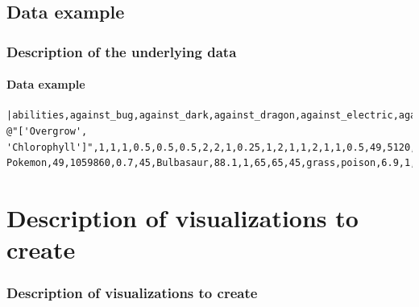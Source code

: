 \documentclass{beamer}
\begin{document}
		\subsection{Data example}
		\begin{frame}[fragile]
			\frametitle{Description of the underlying data}
			\framesubtitle{Data example}
			\begin{lstlisting}[style=mylisting, basicstyle=\small\ttfamily]
|abilities,against_bug,against_dark,against_dragon,against_electric,against_fairy,against_fight,against_fire,against_flying,against_ghost,against_grass,against_ground,against_ice,against_normal,against_poison,against_psychic,against_rock,against_steel,against_water,attack,base_egg_steps,base_happiness,base_total,capture_rate,classfication,defense,experience_growth,height_m,hp,name,percentage_male,pokedex_number,sp_attack,sp_defense,speed,type1,type2,weight_kg,generation,is_legendary|
@"['Overgrow', 'Chlorophyll']",1,1,1,0.5,0.5,0.5,2,2,1,0.25,1,2,1,1,2,1,1,0.5,49,5120,70,318,45,Seed Pokemon,49,1059860,0.7,45,Bulbasaur,88.1,1,65,65,45,grass,poison,6.9,1,0@
			\end{lstlisting}
		\end{frame}
	\section{Description of visualizations to create}
		\begin{frame}
			\frametitle{Description of visualizations to create}
		\end{frame}
\end{document}
